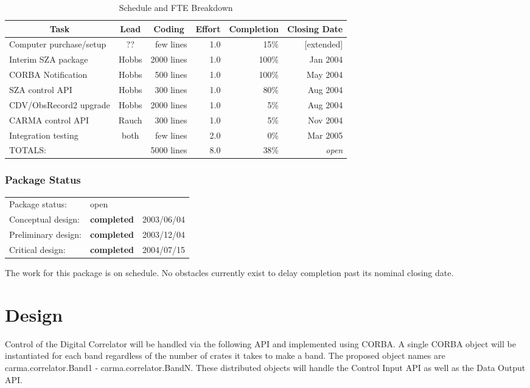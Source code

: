 \documentclass[11pt]{article}
\begin{document}
\begin{table}[thb]
\caption{Schedule and FTE Breakdown\label{tab_sched}}
\begin{center}
\begin{tabular}{lcrrrr} \hline
\multicolumn{1}{c}{Task}& Lead& \multicolumn{1}{c}{Coding}&
  Effort& Completion& Closing Date\\
\hline
Computer purchase/setup&    ??&  few lines&  1.0&  15\%&  [extended] \\
Interim SZA package&     Hobbs& 2000 lines&  1.0& 100\%&  Jan 2004 \\
CORBA Notification&      Hobbs&  500 lines&  1.0& 100\%&  May 2004 \\
SZA control API&         Hobbs&  300 lines&  1.0&  80\%&  Aug 2004 \\
CDV/ObsRecord2 upgrade&  Hobbs& 2000 lines&  1.0&   5\%&  Aug 2004 \\
CARMA control API&       Rauch&  300 lines&  1.0&   5\%&  Nov 2004 \\
Integration testing&      both&  few lines&  2.0&   0\%&  Mar 2005 \\
\hline
\noalign{\vspace{0.5em}}
TOTALS:&                      & 5000 lines&  8.0& 38\%&   {\it open}
\end{tabular}
\end{center}
\end{table}
%
%
\subsubsection{Package Status}
%
%
\begin{tabular}{lll}
Package status:& open&\\
Conceptual design:& {\bf completed}& 2003/06/04\\
Preliminary design:&{\bf completed}& 2003/12/04\\
Critical design:&   {\bf completed}& 2004/07/15\\
\end{tabular}

\bigskip\noindent
The work for this package is on schedule. No obstacles currently exist
to delay completion past its nominal closing date.


%
%
\section{Design}
%
%
Control of the Digital Correlator will be handled via the following API and
implemented using CORBA. A single CORBA object will be instantiated for each
band regardless of the number of crates it takes to make a band. The proposed
object names are carma.correlator.Band1 - carma.correlator.BandN. These
distributed objects will handle the Control Input API as well as the Data
Output API.
\end{document}
